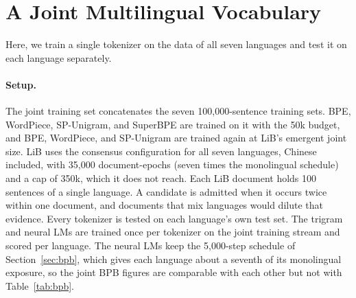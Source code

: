 \documentclass[pdflatex,sn-apa]{sn-jnl}
\begin{document}
\section{A Joint Multilingual Vocabulary}
\label{sec:joint}

Here, we train a single tokenizer on the data of all seven languages and test
it on each language separately.

\paragraph{Setup.}
The joint training set concatenates the seven 100,000-sentence training sets.
BPE, WordPiece, SP-Unigram, and SuperBPE are trained on it with the 50k
budget, and BPE, WordPiece, and SP-Unigram are trained again at LiB's emergent
joint size. LiB uses the consensus configuration for all seven languages,
Chinese included, with 35{,}000 document-epochs (seven times the monolingual
schedule) and a cap of 350k, which it does not reach. Each LiB document holds
100 sentences of a single language. A candidate is admitted when it occurs
twice within one document, and documents that mix languages would dilute that
evidence. Every tokenizer is tested on each language's own test set. The
trigram and neural LMs are trained once per tokenizer on the joint training
stream and scored per language. The neural LMs keep the 5{,}000-step schedule
of Section~\ref{sec:bpb}, which gives each language about a seventh of its
monolingual exposure, so the joint BPB figures are comparable with each other
but not with Table~\ref{tab:bpb}.
\end{document}
